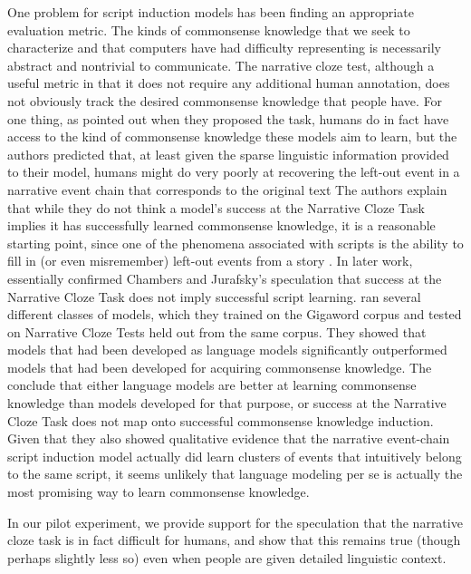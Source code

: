 \documentclass[10pt,a4paper]{article}
\begin{document}
One problem for script induction models has been finding an appropriate evaluation metric.
The kinds of commonsense knowledge that we seek to characterize and that computers have had difficulty representing is necessarily abstract and nontrivial to communicate.
The narrative cloze test, although a useful metric in that it does not require any additional human annotation, does not obviously track the desired commonsense knowledge that people have.
For one thing, as  pointed out when they proposed the task, humans do in fact have access to the kind of commonsense knowledge these models aim to learn, but the authors predicted that, at least given the sparse linguistic information provided to their model, humans might do very poorly at recovering the left-out event in a narrative event chain that corresponds to the original text
The authors explain that while they do not think a model’s success at the Narrative Cloze Task implies it has successfully learned commonsense knowledge, it is a reasonable starting point, since one of the phenomena associated with scripts is the ability to fill in (or even misremember) left-out events from a story \cite{schank1977scripts,bower1979scripts}.
In later work,  essentially confirmed Chambers and Jurafsky’s speculation that success at the Narrative Cloze Task does not imply successful script learning.  ran several different classes of models, which they trained on the Gigaword corpus and tested on Narrative Cloze Tests held out from the same corpus. They showed that models that had been developed as language models significantly outperformed models that had been developed for acquiring commonsense knowledge. The conclude that either language models are better at learning commonsense knowledge than models developed for that purpose, or success at the Narrative Cloze Task does not map onto successful commonsense knowledge induction.
Given that they also showed qualitative evidence that the narrative event-chain script induction model actually did learn clusters of events that intuitively belong to the same script, it seems unlikely that language modeling per se is actually the most promising way to learn commonsense knowledge.

In our pilot experiment, we provide support for the speculation that the narrative cloze task is in fact difficult for humans, and show that this remains true (though perhaps slightly less so) even when people are given detailed linguistic context.
\end{document}
